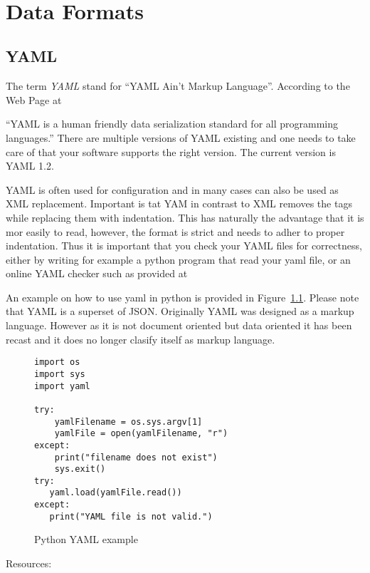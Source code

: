 \FILENAME\
\chapter{Data Formats}
\label{s:data-formats}

\section{YAML}

The term \emph{YAML} stand for ``YAML Ain't Markup
Language''. According to the Web Page at 


``YAML is a human friendly data serialization standard for all
programming languages.'' There are multiple versions of YAML existing
and one needs to take care of that your software supports the right
version. The current version is YAML 1.2.

YAML is often used for configuration and in many cases can also be
used as XML replacement. Important is tat YAM in contrast to XML
removes the tags while replacing them with indentation. This has
naturally the advantage that it is mor easily to read, however, the
format is strict and needs to adher to proper indentation. Thus it is
important that you check your YAML files for correctness, either by
writing for example a python program that read your yaml file, or an
online YAML checker such as provided at 


An example on how to use yaml in python is provided in
Figure~\ref{F:yaml}. Please note that YAML is a superset of
JSON. Originally YAML was designed as a markup language. However as it
is not document oriented but data oriented it has been recast and it
does no longer clasify itself as markup language. 

\begin{figure}[htb]
\begin{lstlisting}
import os
import sys
import yaml

try:
    yamlFilename = os.sys.argv[1]
    yamlFile = open(yamlFilename, "r")
except:
    print("filename does not exist")
    sys.exit()
try:
   yaml.load(yamlFile.read())
except:
   print("YAML file is not valid.")
\end{lstlisting}
\caption{Python YAML example}\label{F:yaml}
\end{figure}

Resources: 

